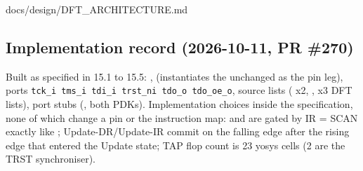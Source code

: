 \begin{relocated}{docs/design/DFT_ARCHITECTURE.md}
\subsection{Implementation record (2026-10-11, PR \#270)}\label{tm:ch:dft-architecture:158-implementation-record-2026-10-11-pr-270}

Built as specified in 15.1 to 15.5: ,
 (instantiates the unchanged
 as the pin leg),  ports
\texttt{tck\_\allowbreak{}i\ tms\_\allowbreak{}i\ tdi\_\allowbreak{}i\ trst\_\allowbreak{}ni\ tdo\_\allowbreak{}o\ tdo\_\allowbreak{}oe\_\allowbreak{}o},
source lists ( x2, ,
 x3 DFT lists), port stubs
(, both PDKs). Implementation choices inside the
specification, none of which change a pin or the instruction map:
 and  are gated by IR = SCAN exactly
like ; Update-DR/\allowbreak{}Update-IR commit on the
falling edge after the rising edge that entered the Update state; TAP
flop count is 23 yosys cells (2 are the TRST synchroniser).

{\footnotesize\setlength{\tabcolsep}{3pt}

}
\end{relocated}
